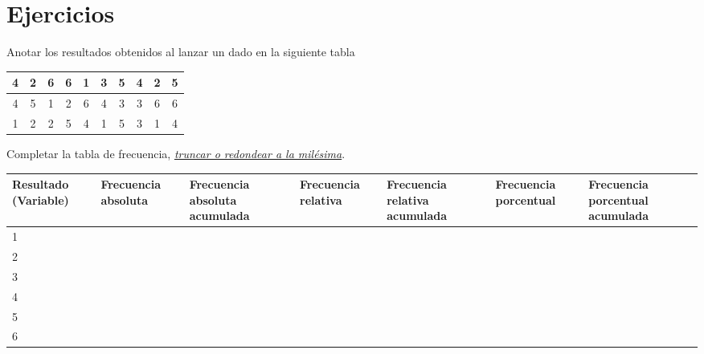 \section{Ejercicios}

\begin{exercise}
    Anotar los resultados obtenidos al lanzar un dado en la siguiente tabla
    \begin{table}[H]
        \centering
        \begin{tabular}{|c|c|c|c|c|c|c|c|c|c|}
            \hline
            4 & 2 & 6 & 6 & 1 & 3 & 5 & 4 & 2 & 5 \\\hline
            4 & 5 & 1 & 2 & 6 & 4 & 3 & 3 & 6 & 6 \\\hline
            1 & 2 & 2 & 5 & 4 & 1 & 5 & 3 & 1 & 4 \\\hline
        \end{tabular}
    \end{table}
    Completar la tabla de frecuencia, \underline{\textit{truncar o redondear a la milésima}}.
    \begin{table}[H]
        \centering
        \begin{tabular}{|p{1.8cm}|p{1.8cm}|p{2cm}|p{1.8cm}|p{2cm}|p{2cm}|p{2cm}|}
            \hline
            Resultado (Variable) & Frecuencia absoluta & Frecuencia absoluta acumulada & Frecuencia relativa & Frecuencia relativa acumulada & Frecuencia porcentual & Frecuencia porcentual acumulada\\
            \hline\hline
            1 & & & & & & \\\hline
            2 & & & & & & \\\hline
            3 & & & & & & \\\hline
            4 & & & & & & \\\hline
            5 & & & & & & \\\hline
            6 & & & & & & \\\hline
        \end{tabular}
    \end{table}
\end{exercise}
